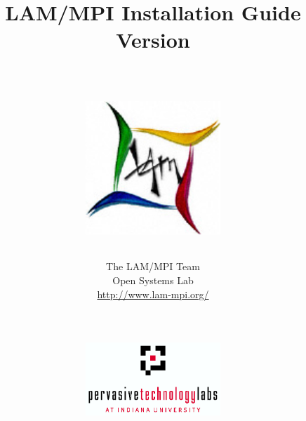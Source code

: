 %
% 
%
%

\title{LAM/MPI Installation Guide \\
Version \lamversion \\
\ \\
\centerline{\includegraphics[width=2in]{lam-logo}}}

\author{The LAM/MPI Team \\
Open Systems Lab \\
\url{http://www.lam-mpi.org/} \\
\ \\
\ \\
\centerline{\includegraphics[width=2in]{ptl-logo}}
\ \\
\ \\}

\maketitle

\thispagestyle{empty}

\newpage

\vspace*{6in}


